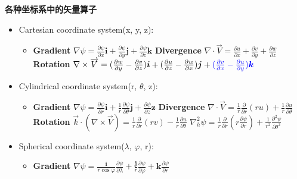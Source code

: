 \documentclass[cn, twoside]{myModel}
\begin{document}
	\maketitle
	\begin{cnabstract}
		\par{}\noindent{}\textcolor{blue!70!black}{\textbf{各种坐标系中的矢量算子}}
		\begin{itemize}
			\item
			Cartesian coordinate system(x, y, z):
			\begin{itemize}
				\item[]
				\textbf{Gradient} $\nabla\psi=\frac{\partial \psi}{\partial x}\boldsymbol{i}+\frac{\partial \psi}{\partial y}\boldsymbol{j}+\frac{\partial \psi}{\partial z}\boldsymbol{k}$ \quad
				\textbf{Divergence} $\nabla\cdot\overrightarrow{V}=\frac{\partial u}{\partial x}+\frac{\partial v}{\partial y}+\frac{\partial w}{\partial z}$\\
				\textbf{Rotation} $\nabla\times\overrightarrow{V}=(\frac{\partial w}{\partial y}-\frac{\partial v}{\partial z})\boldsymbol{i}+(\frac{\partial u}{\partial z}-\frac{\partial w}{\partial x})\boldsymbol{j}+\textcolor{blue}{(\frac{\partial v}{\partial x}-\frac{\partial u}{\partial y})\boldsymbol{k}}$
			\end{itemize}
			\item
			Cylindrical coordinate system(r, $\theta$, z):
			\begin{itemize}
				\item[]
				\textbf{Gradient} 
				$\nabla\psi=\frac{\partial \psi}{\partial r}\boldsymbol{i}+\frac{1}{r}\frac{\partial \psi}{\partial \theta}\boldsymbol{j}+\frac{\partial \psi}{\partial z}\boldsymbol{z}$ \quad
				\textbf{Divergence} $\nabla\cdot\overrightarrow{V}=\frac{1}{r}\frac{\partial}{\partial r}(ru)+\frac{1}{r}\frac{\partial u}{\partial \theta}$ \\
				\textbf{Rotation} $\overrightarrow{k}\cdot(\nabla\times\overrightarrow{V})=\frac{1}{r}\frac{\partial}{\partial r}(rv)-\frac{1}{r}\frac{\partial u}{\partial \theta}$ \quad
				$\nabla^2_{h}\psi=\frac{1}{r}\frac{\partial}{\partial r}(r\frac{\partial \psi}{\partial r})+\frac{1}{r^2}\frac{\partial^2 \psi}{\partial \theta^2}$
			\end{itemize}
			\item
			Spherical coordinate system($\lambda$, $\varphi$, r):
			\begin{itemize}
				\item[]
				\textbf{Gradient} $\nabla\psi=\frac{\boldsymbol{i}}{r\cos{\varphi}}\frac{\partial \psi}{\partial \lambda}+\frac{\boldsymbol{j}}{r}\frac{\partial \psi}{\partial \varphi}+\boldsymbol{k}\frac{\partial \psi}{\partial r}$ \quad

\end{itemize}
\end{itemize}
\end{cnabstract}
\end{document}
